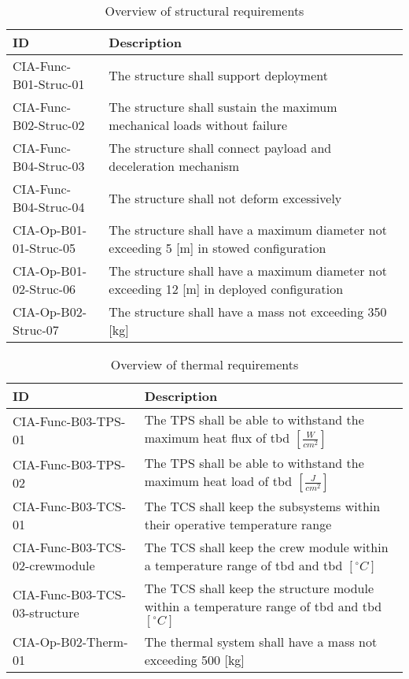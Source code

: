 \begin{table}[H]
	\caption*{Overview of structural requirements}
	\begin{tabular}{|p{}|p{}|}
    \hline
    ID          & Description                                                                                                      \\ \hline \hline
    CIA-Func-B01-Struc-01 & The structure shall support deployment \\ \hline
    CIA-Func-B02-Struc-02 & The structure shall sustain the maximum mechanical loads without failure                           \\ \hline
    CIA-Func-B04-Struc-03 & The structure shall connect payload and deceleration mechanism \\ \hline
    CIA-Func-B04-Struc-04 & The structure shall not deform excessively \\ \hline
    CIA-Op-B01-01-Struc-05 & The structure shall have a maximum diameter not exceeding 5 [m] in stowed configuration                              \\ \hline
    CIA-Op-B01-02-Struc-06 & The structure shall have a maximum diameter not exceeding 12 [m] in deployed configuration     \\ \hline
    CIA-Op-B02-Struc-07 & The structure shall have a mass not exceeding 350 [kg]\\ \hline
    \end{tabular}
\end{table}

\begin{table}[H]
	\caption*{Overview of thermal requirements}
	\begin{tabular}{|p{}|p{}|}
    \hline
    ID          & Description                                                                                                      \\ \hline \hline
   CIA-Func-B03-TPS-01 & The TPS shall be able to withstand the maximum heat flux of \gls{tbd} $ \left[\frac{W}{cm^2}\right] $               
\\ \hline
    CIA-Func-B03-TPS-02 &  The TPS shall be able to withstand the maximum heat load of \gls{tbd} $ \left[\frac{J}{cm^2}\right] $               
\\ \hline
    CIA-Func-B03-TCS-01 & The TCS shall keep the subsystems within their operative temperature range                                            
\\ \hline
    CIA-Func-B03-TCS-02-crewmodule & The TCS shall keep the crew module within a temperature range of \gls{tbd} and \gls{tbd} $ \left[^{\circ}C\right] $                                        
\\ \hline
    CIA-Func-B03-TCS-03-structure & The TCS shall keep the structure module within a temperature range of \gls{tbd} and \gls{tbd} $ \left[^{\circ}C\right] $                                        
\\ \hline
	CIA-Op-B02-Therm-01 	&	The thermal system shall have a mass not exceeding 500 [kg]  							\\ \hline
    \end{tabular}
\end{table}

